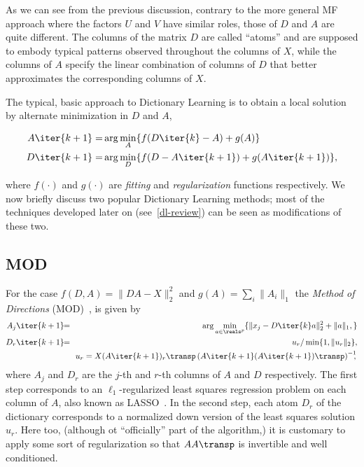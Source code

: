 \documentclass[twocolumn]{IEEEtran}
\begin{document}
As we can see from the previous discussion, contrary to the more general MF approach where the factors $U$ and $V$ have similar roles, those of $D$ and $A$ are quite different. The columns of the matrix $D$ are called ``atoms'' and are supposed to embody typical patterns observed throughout the columns of $X$, while the columns of $A$ specify the linear combination of columns of $D$ that better approximates the corresponding columns of $X$.

The typical, basic approach to Dictionary Learning is to obtain a local solution by alternate minimization in $D$ and $A$,

\begin{eqnarray}
A\iter{k+1} =& \arg\min_{A} \{ f(D\iter{k}-A) + g(A) \} \\
D\iter{k+1} =& \arg\min_{D} \{ f(D-A\iter{k+1}) + g(A\iter{k+1}) \},
\label{eq:dl}
\end{eqnarray}

where $f(\cdot)$ and $g(\cdot)$ are \emph{fitting} and \emph{regularization} functions respectively. We now briefly discuss two popular Dictionary Learning methods; most of the techniques developed later on (see~\ref{dl-review}) can be seen as modifications of these two.

\subsection{MOD} For the case $f(D,A)=\|DA-X\|_2^2$ and $g(A)=\sum_{i}\|A_i\|_1$ the \emph{Method of Directions} (MOD)~\cite{mod}, is given by
\begin{eqnarray}
A_j\iter{k+1}\!\! &=&\!\! \arg\min_{a \in \reals^p} \{ \|x_j - D\iter{k}a \|_2^2 + \|a\|_1, \} \\
D_r\iter{k+1}\!\! &=&\!\! u_r/\min\{1,\|u_r\|_2\},\\
\!\!&&\!\!u_r = X(A\iter{k+1})_r\transp\left(A\iter{k+1}(A\iter{k+1})\transp\right)^{-1}\!\!\!,\,
\label{eq:mod}
\end{eqnarray}
where $A_j$ and $D_r$ are the $j$-th and $r$-th columns of $A$ and $D$ respectively. The first step corresponds to an $\ell_1$-regularized least squares regression problem on each column of $A$, also known as LASSO~\cite{lasso}.
In the second step, each atom $D_r$ of the dictionary corresponds to a normalized down version of the least squares solution $u_r$. Here too, (although ot ``officially'' part of the algorithm,) it is customary  to apply some sort of regularization so that $AA\transp$ is invertible and well conditioned.
\end{document}

